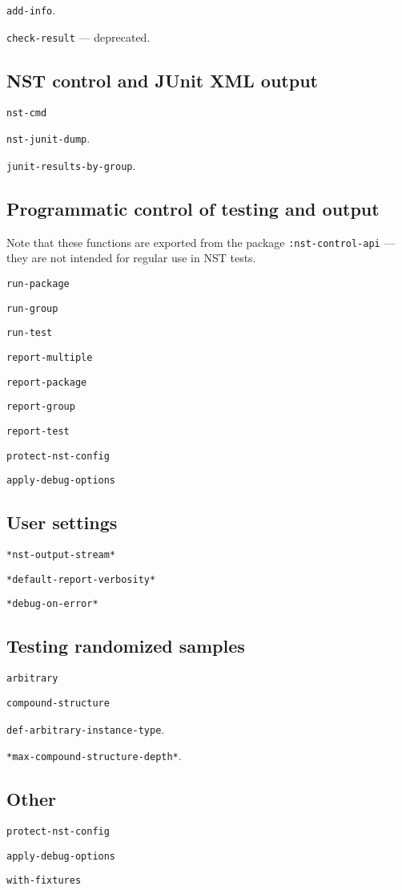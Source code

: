 \texttt{add-info}.

\texttt{check-result} ---
deprecated.
             
\subsection{NST control and JUnit XML output}
\texttt{nst-cmd}

\texttt{nst-junit-dump}.

\texttt{junit-results-by-group}.

\subsection{Programmatic control of testing and output}
Note that these functions are exported from the package
\texttt{:nst-control-api} --- they are not intended for regular use in
NST tests.

\texttt{run-package}

\texttt{run-group}

\texttt{run-test}
             
\texttt{report-multiple}

\texttt{report-package}

\texttt{report-group}

\texttt{report-test}

\texttt{protect-nst-config}

\texttt{apply-debug-options}

\subsection{User settings}
\texttt{*nst-output-stream*}

\texttt{*default-report-verbosity*}

\texttt{*debug-on-error*}

\subsection{Testing randomized samples}
\texttt{arbitrary}

\texttt{compound-structure}

\texttt{def-arbitrary-instance-type}.

\texttt{*max-compound-structure-depth*}.

\subsection{Other}
\texttt{protect-nst-config}

\texttt{apply-debug-options}

\texttt{with-fixtures}


